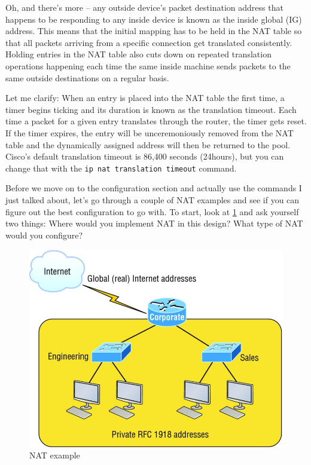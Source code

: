 Oh, and there's more -- any outside device's packet destination address
that happens to be responding to any inside device is known as the
inside global (IG) address. This means that the initial mapping has to
be held in the NAT table so that all packets arriving from a specific
connection get translated consistently. Holding entries in the NAT table
also cuts down on repeated translation operations happening each time
the same inside machine sends packets to the same outside destinations
on a regular basis.

Let me clarify: When an entry is placed into the NAT table the first
time, a timer begins ticking and its duration is known as the
translation timeout. Each time a packet for a given entry translates
through the router, the timer gets reset. If the timer expires, the
entry will be unceremoniously removed from the NAT table and the
dynamically assigned address will then be returned to the pool. Cisco's
default translation timeout is 86,400 seconds (24hours), but you can
change that with the \texttt{ip\ nat\ translation\ timeout} command.

Before we move on to the configuration section and actually use the commands I just talked about,
let's go through a couple of NAT examples and see if you can figure out the best configuration to go with.
To start, look at \cref{fig:nat-example} and ask yourself two things:
Where would you implement NAT in this design?
What type of NAT would you configure?


\begin{figure}
   \centering
   \includegraphics{images/c13f004.jpg}
   \caption{NAT example}
   \label{fig:nat-example}
\end{figure}



